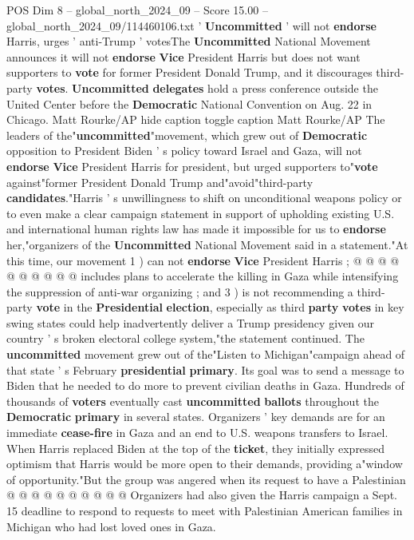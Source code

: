 \begin{textsample}{POS Dim 8 – global\_north\_2024\_09 – Score 15.00 – global\_north\_2024\_09/114460106.txt}  \label{ex:f8_pos_084}
' \textbf{Uncommitted} ' will not \textbf{endorse} Harris, urges ' anti-Trump ' votesThe \textbf{Uncommitted} National Movement announces it will not \textbf{endorse} \textbf{Vice} President Harris but does not want supporters to \textbf{vote} for former President Donald Trump, and it discourages third-party \textbf{votes}. \textbf{Uncommitted} \textbf{delegates} hold a press conference outside the United Center before the \textbf{Democratic} National Convention on Aug. 22 in Chicago.
Matt Rourke/AP hide caption toggle caption Matt Rourke/AP The leaders of the"\textbf{uncommitted}"movement, which grew out of \textbf{Democratic} opposition to President Biden ' s policy toward Israel and Gaza, will not \textbf{endorse} \textbf{Vice} President Harris for president, but urged supporters to"\textbf{vote} against"former President Donald Trump and"avoid"third-party \textbf{candidates}."Harris ' s unwillingness to shift on unconditional weapons policy or to even make a clear campaign statement in support of upholding existing U.S. and international human rights law has made it impossible for us to \textbf{endorse} her,"organizers of the \textbf{Uncommitted} National Movement said in a statement."At this time, our movement 1 ) can not \textbf{endorse} \textbf{Vice} President Harris ; @ @ @ @ @ @ @ @ @ @ includes plans to accelerate the killing in Gaza while intensifying the suppression of anti-war organizing ; and 3 ) is not recommending a third-party \textbf{vote} in the \textbf{Presidential} \textbf{election}, especially as third \textbf{party} \textbf{votes} in key swing states could help inadvertently deliver a Trump presidency given our country ' s broken electoral college system,"the statement continued.
The \textbf{uncommitted} movement grew out of the"Listen to Michigan"campaign ahead of that state ' s February \textbf{presidential} \textbf{primary}.
Its goal was to send a message to Biden that he needed to do more to prevent civilian deaths in Gaza.
Hundreds of thousands of \textbf{voters} eventually cast \textbf{uncommitted} \textbf{ballots} throughout the \textbf{Democratic} \textbf{primary} in several states.
Organizers ' key demands are for an immediate \textbf{cease-fire} in Gaza and an end to U.S. weapons transfers to Israel.
When Harris replaced Biden at the top of the \textbf{ticket}, they initially expressed optimism that Harris would be more open to their demands, providing a"window of opportunity."But the group was angered when its request to have a Palestinian @ @ @ @ @ @ @ @ @ @ Organizers had also given the Harris campaign a Sept. 15 deadline to respond to requests to meet with Palestinian American families in Michigan who had lost loved ones in Gaza.

\end{textsample}
